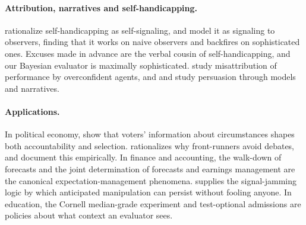 \documentclass[11pt]{article}
\theoremstyle{definition}
\begin{document}
\paragraph{Attribution, narratives and self-handicapping.} \citet{BenabouTirole2002} rationalize self-handicapping as self-signaling, and \citet{XiangGershmanGerstenberg2026} model it as signaling to observers, finding that it works on naive observers and backfires on sophisticated ones. Excuses made in advance are the verbal cousin of self-handicapping, and our Bayesian evaluator is maximally sophisticated. \citet{HeidhuesKoszegiStrack2018} study misattribution of performance by overconfident agents, and \citet{SchwartzsteinSunderam2021} and \citet{EliazSpiegler2020} study persuasion through models and narratives.

\paragraph{Applications.} In political economy, \citet{AshworthBdMFriedenberg2017} show that voters' information about circumstances shapes both accountability and selection. \citet{Garro2019} rationalizes why front-runners avoid debates, and \citet{CaseyGlennerster2024} document this empirically. In finance and accounting, the walk-down of forecasts \citep{Matsumoto2002,RichardsonTeohWysocki2004} and the joint determination of forecasts and earnings management \citep{Beyer2009} are the canonical expectation-management phenomena. \citet{Stein1989} supplies the signal-jamming logic by which anticipated manipulation can persist without fooling anyone. In education, the Cornell median-grade experiment \citep{BarKadiyaliZussman2009} and test-optional admissions \citep{DesseinFrankelKartik2025} are policies about what context an evaluator sees.
\end{document}
